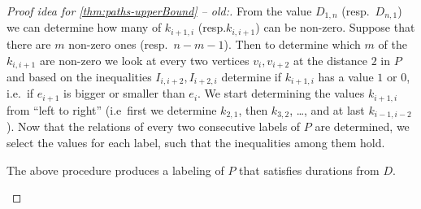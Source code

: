 \documentclass[a4paper,UKenglish,cleveref, autoref, thm-restate]{lipics-v2021}
\begin{document}
\begin{proof}[Proof idea for \cref{thm:paths-upperBound} -- old:]
	From the value $D_{1,n}$ (resp.~$D_{n,1}$) we can determine how many of $k_{i+1,i}$ (resp.$k_{i,i+1}$) can be non-zero. Suppose that there are $m$ non-zero ones (resp.~$n-m-1$).
	Then to determine which $m$ of the $k_{i,i+1}$ are non-zero we look at every two vertices $v_i, v_{i+2}$ at the distance $2$ in $P$ 
	and based on the inequalities $I_{i,i+2}, I_{i+2,i}$ determine if $k_{i+1,i}$ has a value $1$ or $0$,
	i.e.~if $e_{i+1}$ is bigger or smaller than $e_i$.
	We start determining the values $k_{i+1,i}$ from ``left to right'' (i.e~first we determine $k_{2,1}$, then $k_{3,2}$, \dots, and at last $k_{i-1,i-2}$).
	Now that the relations of every two consecutive labels of $P$ are determined, 
	we select the values for each label, such that the inequalities among them hold.
	\begin{claim}
		The above procedure produces a labeling of $P$ that satisfies durations from $D$.
	\end{claim}
\end{proof}


	
\end{document}
